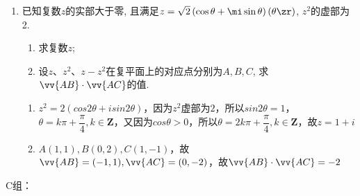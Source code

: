 \begin{enumerate}
    \item 已知复数$z$的实部大于零, 且满足$z=\sqrt{2}\left(\cos\theta+\mi\sin\theta\right)\left(\theta\zr\right)$, $z^2$的虚部为2. 
    \begin{enumerate}[(1)]
    \item 求复数$z$; 
    \item 设$z$、$z^2$、$z-z^2$在复平面上的对应点分别为$A,B,C$, 求$\vv{AB}\cdot\vv{AC}$的值. 
    \end{enumerate}
    \begin{jieda}
        \begin{enumerate}
            \item $z^2 = 2(cos2\theta + i sin2\theta)$，因为$z^2$虚部为$2$，所以$sin2\theta = 1$，$\theta = k\pi + \dfrac{\pi}{4}, k \in \mathbf{Z}$，又因为$cos\theta > 0$，所以$\theta = 2k\pi + \dfrac{\pi}{4}, k \in \mathbf{Z}$，故$z = 1+i$
            \item $A(1, 1), B(0, 2), C(1, -1)$，故$\vv{AB} = (-1, 1), \vv{AC} = (0, -2)$，故$\vv{AB} \cdot \vv{AC} = -2$
        \end{enumerate}
    \end{jieda}
\end{enumerate}
C组：

